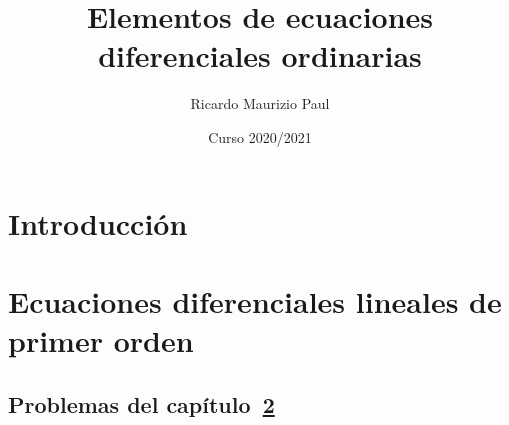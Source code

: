 \documentclass{report}
\title{Elementos de ecuaciones diferenciales ordinarias}
\author{Ricardo Maurizio Paul}
\date{Curso 2020/2021}
\begin{document}
\maketitle
\tableofcontents

\setcounter{chapter}{-1}
\chapter{Introducción}


\chapter{Ecuaciones diferenciales lineales de primer orden}
\label{chap:capitulo1}


\section{Problemas del capítulo~\ref{chap:capitulo1}}

\end{document}
